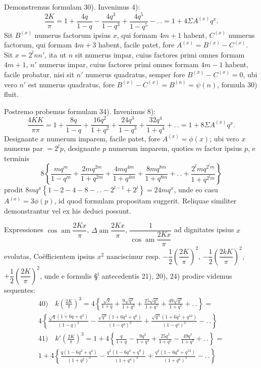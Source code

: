 \documentclass{article}
\begin{document}
Demonstremus formulam 30). Invenimus 4):
\[
\frac{2K}{\pi}=1+\frac{4q}{1-q}-\frac{4q^{3}}{1-q^{3}}+\frac{4q^{5}}{1-q^{5}}-.\,.=1+4\Sigma A^{(x)}q^{x}.
\]
Sit $B^{(x)}$ numerus factorum ipsius $x$, qui formam $4m+1$ habent, $C^{(x)}$ numerus factorum, qui formam $4m+3$ habent, facile patet, fore $A^{(x)}=B^{(x)}-C^{(x)}$. Sit $x=2^{l}nn'$, ita ut $n$ sit numerus impar, cuius factores primi omnes formam $4m+1$, $n'$ numerus impar, cuius factores primi omnes formam $4m-1$ habent, facile probatur, nisi sit $n'$ numerus quadratus, semper fore $B^{(x)}-C^{(x)}=0$, ubi vero $n'$ est numerus quadratus, fore $B^{(x)}-C^{(x)}=B^{(n)}=\psi(n)$, formula 30) fluit.

Postremo probemus formulam 34). Invenimus 8):
\[
\frac{4KK}{\pi\pi}=1+\frac{8q}{1-q}+\frac{16q^{2}}{1+q^{2}}+\frac{24q^{3}}{1-q^{3}}+\frac{32q^{4}}{1+q^{4}}+.\,.=1+8\Sigma A^{(x)}q^{x}.
\]
Designante $x$ numerum imparem, facile patet, fore $A^{(x)}=\phi(x)$; ubi vero $x$ numerus par $=2^{l}p$, designante $p$ numerum imparem, quoties $m$ factor ipsius $p$, e terminis
\[
8\left\{\frac{mq^{m}}{1-q^{m}}+\frac{2mq^{2m}}{1+q^{2m}}+\frac{4mq^{4m}}{1+q^{4m}}+\frac{8mq^{8m}}{1+q^{8m}}+.\,.+\frac{2^{l}mq^{2^{l}m}}{1+q^{2^{l}m}}\right\}
\]
prodit $8mq^{x}\left\{1-2-4-8-.\,.-2^{l-1}+2^{l}\right\}=24mq^{x}$, unde eo casu $A^{(x)}=3\phi(p)$, id quod formulam propositam suggerit. Reliquae similiter demonstrantur vel ex his deduci possunt.

Expressiones $\cos\operatorname{am}\dfrac{2Kx}{\pi}$, $\Delta\operatorname{am}\dfrac{2Kx}{\pi}$, $\dfrac{1}{\cos\operatorname{am}\dfrac{2Kx}{\pi}}$ ad dignitates ipsius $x$ evolutas, Coëfficientem ipsius $x^{2}$ nanciscimur resp. $-\dfrac{1}{2}\left(\dfrac{2K}{\pi}\right)^{2}$, $-\dfrac{1}{2}\left(\dfrac{2kK}{\pi}\right)^{2}$, $+\dfrac{1}{2}\left(\dfrac{2K}{\pi}\right)^{2}$, unde e formulis §$^{\mathrm{i}}$ antecedentis 21), 20), 24) prodire videmus sequentes:
\[
\begin{gathered}
\text{40)}\quad k\left(\frac{2K}{\pi}\right)^{3}=4\left\{\frac{\sqrt{q}}{1+q}+\frac{9\sqrt{q^{3}}}{1+q^{3}}+\frac{25\sqrt{q^{5}}}{1+q^{5}}+\frac{49\sqrt{q^{7}}}{1+q^{7}}+.\,.\right\}=\\[2ex]
4\left\{\frac{\sqrt{q}(1+6q+q^{2})}{(1-q)^{3}}-\frac{\sqrt{q^{3}}(1+6q^{3}+q^{6})}{(1-q^{3})^{3}}+\frac{\sqrt{q^{5}}(1+6q^{5}+q^{10})}{(1-q^{5})^{3}}-.\,.\right\}\\[2ex]
\text{41)}\quad k'\left(\frac{2K}{\pi}\right)^{3}=1+4\left\{\frac{q}{1+q}-\frac{9q^{3}}{1+q^{3}}+\frac{25q^{5}}{1+q^{5}}-\frac{49q^{7}}{1+q^{7}}+.\,.\right\}=\\[2ex]
1+4\left\{\frac{q(1-6q^{2}+q^{4})}{(1+q^{2})^{3}}-\frac{q^{2}(1-6q^{4}+q^{8})}{(1+q^{4})^{3}}+\frac{q^{3}(1-6q^{6}+q^{12})}{(1+q^{6})^{3}}-.\,.\right\}
\end{gathered}
\]
\end{document}
